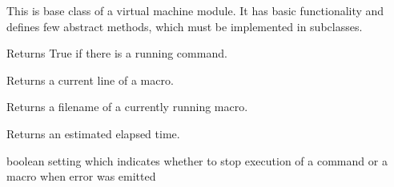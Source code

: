 \documentclass[letterpaper,10pt,english]{sphinxmanual}
\begin{document}
\begin{fulllineitems}
\label{sysmod:pyfrid.modules.system.vm.core.vm.BaseVMModule}
This is base class of a virtual machine module. It has basic functionality and
defines few abstract methods, which must be implemented in subclasses.

\begin{fulllineitems}
\label{sysmod:pyfrid.modules.system.vm.core.vm.BaseVMModule.busy}
Returns True if there is a running command.

\end{fulllineitems}


\begin{fulllineitems}
\label{sysmod:pyfrid.modules.system.vm.core.vm.BaseVMModule.current_line}
Returns a current line of a macro.

\end{fulllineitems}


\begin{fulllineitems}
\label{sysmod:pyfrid.modules.system.vm.core.vm.BaseVMModule.current_macro}
Returns a filename of a currently running macro.

\end{fulllineitems}


\begin{fulllineitems}
\label{sysmod:pyfrid.modules.system.vm.core.vm.BaseVMModule.elapsed}
Returns an estimated elapsed time.

\end{fulllineitems}


\begin{fulllineitems}
\label{sysmod:pyfrid.modules.system.vm.core.vm.BaseVMModule.err_stop}
boolean setting which indicates whether to stop execution of a command or a macro
when error was emitted


\end{fulllineitems}
\end{fulllineitems}
\end{document}
